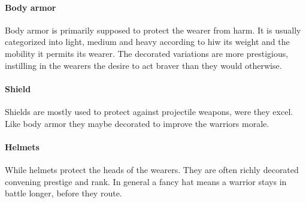 \paragraph{Body armor}
Body armor is primarily supposed to protect the wearer from harm. It is usually
categorized into light, medium and heavy according to hiw its weight and the
mobility it permits its wearer. The decorated variations are more prestigious,
instilling in the wearers the desire to act braver than they would otherwise.

\paragraph{Shield}
Shields are mostly used to protect against projectile weapons, were they excel.
Like body armor they maybe decorated to improve the warriors morale.

\paragraph{Helmets}
While helmets protect the heads of the wearers. They are often richly decorated
convening prestige and rank. In general a fancy hat means a warrior stays in
battle longer, before they route.
